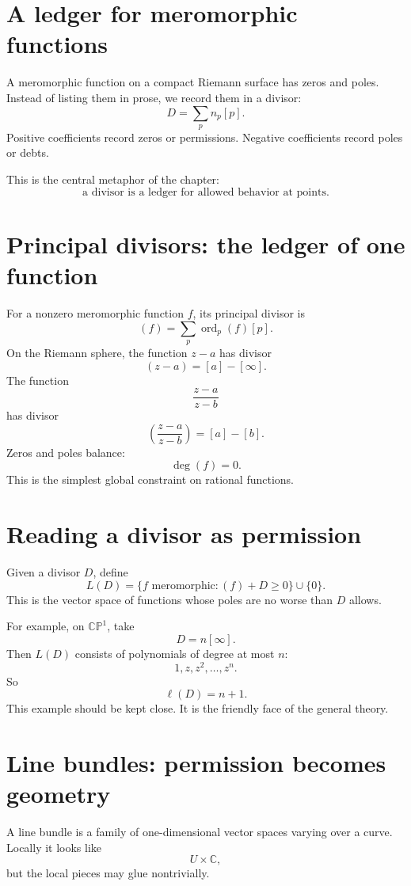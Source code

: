 
\section{A ledger for meromorphic functions}

A meromorphic function on a compact Riemann surface has zeros and poles. Instead of listing them in prose, we record them in a divisor:
\[
  D=\sum_p n_p[p].
\]
Positive coefficients record zeros or permissions. Negative coefficients record poles or debts.

This is the central metaphor of the chapter:
\[
  \text{a divisor is a ledger for allowed behavior at points.}
\]

\section{Principal divisors: the ledger of one function}

For a nonzero meromorphic function \(f\), its principal divisor is
\[
  (f)=\sum_p\operatorname{ord}_p(f)[p].
\]
On the Riemann sphere, the function \(z-a\) has divisor
\[
  (z-a)=[a]-[\infty].
\]
The function
\[
  \frac{z-a}{z-b}
\]
has divisor
\[
  \left(\frac{z-a}{z-b}\right)=[a]-[b].
\]
Zeros and poles balance:
\[
  \deg(f)=0.
\]
This is the simplest global constraint on rational functions.

\section{Reading a divisor as permission}

Given a divisor \(D\), define
\[
  L(D)=\{f\text{ meromorphic}:(f)+D\ge0\}\cup\{0\}.
\]
This is the vector space of functions whose poles are no worse than \(D\) allows.

For example, on \(\mathbb{CP}^1\), take
\[
  D=n[\infty].
\]
Then \(L(D)\) consists of polynomials of degree at most \(n\):
\[
  1,z,z^2,\ldots,z^n.
\]
So
\[
  \ell(D)=n+1.
\]
This example should be kept close. It is the friendly face of the general theory.

\section{Line bundles: permission becomes geometry}

A line bundle is a family of one-dimensional vector spaces varying over a curve. Locally it looks like
\[
  U\times\mathbb C,
\]
but the local pieces may glue nontrivially.

